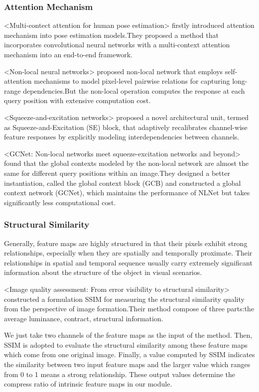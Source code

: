 \documentclass[11pt]{article}
\begin{document}
\subsubsection{Attention Mechanism}
<Multi-contect attention for human pose estimation> firstly introduced attention mechanism into pose estimation models.They proposed a method that incorporates convolutional neural networks with a multi-context attention mechanism into an end-to-end framework.

<Non-local neural networks> proposed non-local network that employs self-attention mechanisms to model pixel-level pairwise relations
for capturing long-range dependencies.But the non-local operation computes the response at each query position with extensive computation cost.

<Squeeze-and-excitation networks> proposed a novel architectural unit, termed as Squeeze-and-Excitation (SE) block, that adaptively recalibrates channel-wise feature responses by explicitly modeling interdependencies between channels.

<GCNet: Non-local networks meet squeeze-excitation networks and beyond> found that the global contexts modeled by the non-local network are almost the same for different query positions within an image.They designed a better instantiation, called the global context block (GCB) and constructed a global context network (GCNet), which maintains the performance of NLNet but takes significantly less computational cost.

\subsubsection{Structural Similarity}
Generally, feature maps are highly structured in that their pixels exhibit strong relationships, especially when they are spatially and temporally proximate. Their relationships in spatial and temporal sequence usually carry extremely significant information about the structure of the object in visual scenarios.

<Image quality assessment: From error visibility to structural similarity> constructed a formulation SSIM for measuring the structural similarity quality from the perspective of image formation.Their method compose of three parts:the average luminance, contract, structural information.

We just take two channels of the feature maps as the input of the method. Then, SSIM is adopted to evaluate the structural similarity among these feature maps which come from one original image. Finally, a value computed by SSIM indicates the similarity between two input feature maps and the larger value which ranges from 0 to 1 means a strong relationship. These output values determine the compress ratio of intrinsic feature maps in our module.
\end{document}
